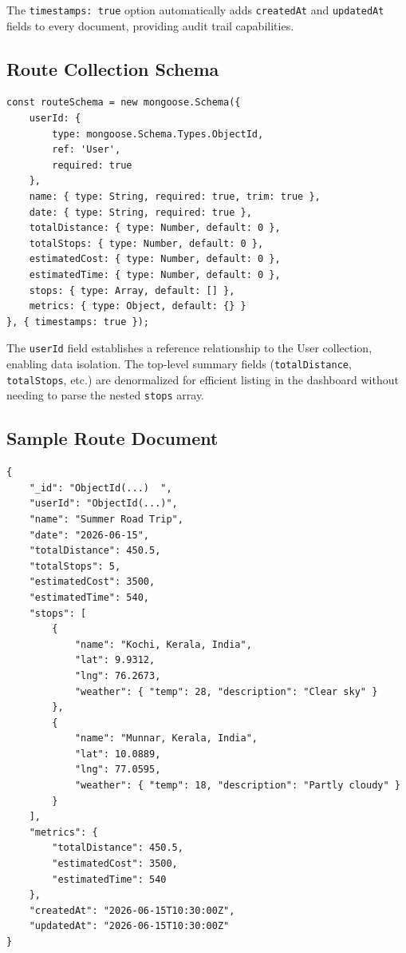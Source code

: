 The \texttt{timestamps: true} option automatically adds \texttt{createdAt} and \texttt{updatedAt} fields to every document, providing audit trail capabilities.

\subsection{Route Collection Schema}
\begin{lstlisting}[style=csharpstyle]
const routeSchema = new mongoose.Schema({
    userId: {
        type: mongoose.Schema.Types.ObjectId,
        ref: 'User',
        required: true
    },
    name: { type: String, required: true, trim: true },
    date: { type: String, required: true },
    totalDistance: { type: Number, default: 0 },
    totalStops: { type: Number, default: 0 },
    estimatedCost: { type: Number, default: 0 },
    estimatedTime: { type: Number, default: 0 },
    stops: { type: Array, default: [] },
    metrics: { type: Object, default: {} }
}, { timestamps: true });
\end{lstlisting}

The \texttt{userId} field establishes a reference relationship to the User collection, enabling data isolation. The top-level summary fields (\texttt{totalDistance}, \texttt{totalStops}, etc.) are denormalized for efficient listing in the dashboard without needing to parse the nested \texttt{stops} array.

\subsection{Sample Route Document}
\begin{lstlisting}[style=csharpstyle]
{
    "_id": "ObjectId(...)  ",
    "userId": "ObjectId(...)",
    "name": "Summer Road Trip",
    "date": "2026-06-15",
    "totalDistance": 450.5,
    "totalStops": 5,
    "estimatedCost": 3500,
    "estimatedTime": 540,
    "stops": [
        {
            "name": "Kochi, Kerala, India",
            "lat": 9.9312,
            "lng": 76.2673,
            "weather": { "temp": 28, "description": "Clear sky" }
        },
        {
            "name": "Munnar, Kerala, India",
            "lat": 10.0889,
            "lng": 77.0595,
            "weather": { "temp": 18, "description": "Partly cloudy" }
        }
    ],
    "metrics": {
        "totalDistance": 450.5,
        "estimatedCost": 3500,
        "estimatedTime": 540
    },
    "createdAt": "2026-06-15T10:30:00Z",
    "updatedAt": "2026-06-15T10:30:00Z"
}
\end{lstlisting}

